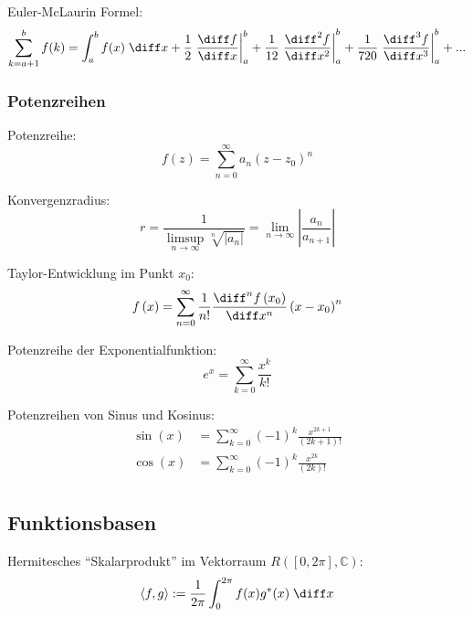 \documentclass[11pt]{article}
\numberwithin{equation}{section}
\begin{document}
          Euler-McLaurin Formel:
          \begin{equation}
            \sum_{k=a+1}^{b} f(k) = \int_{a}^{b}f(x) \;\diff x
            + \frac{1}{2}   \left.\frac{\diff   f}{\diff x  } \right|_{a}^{b}
            + \frac{1}{12}  \left.\frac{\diff^2 f}{\diff x^2} \right|_{a}^{b}
            + \frac{1}{720} \left.\frac{\diff^3 f}{\diff x^3} \right|_{a}^{b}
            + ...
          \end{equation}

        \subsubsection{Potenzreihen}
          Potenzreihe:
          \begin{equation}
            f(z) = \sum_{n=0}^{\infty} a_n (z-z_0)^n
          \end{equation}

          Konvergenzradius:
          \begin{equation}
            r = \frac{1}{\limsup\limits_{n\rightarrow\infty} \sqrt[n]{\left|a_n\right|}} = \lim_{n\rightarrow\infty}\left|\frac{a_n}{a_{n+1}}\right|
          \end{equation}

          Taylor-Entwicklung im Punkt $x_0$:
          \begin{equation}
            f\left(x\right)=\sum_{n=0}^{\infty}\frac{1}{n!}\frac{\diff^{n}f\left(x_0\right)}{\diff x^{n}}\left(x-x_0\right)^{n}
          \end{equation}

    			Potenzreihe der Exponentialfunktion:
    			\begin{equation}
    				e^x=\sum_{k=0}^{\infty}{\frac{x^k}{k!}}
    			\end{equation}

          Potenzreihen von Sinus und Kosinus:
          \begin{equation}
            \begin{aligned}
              \sin(x) &= \sum_{k=0}^\infty (-1)^k \frac{x^{2k+1}}{(2k+1)!} \\
              \cos(x) &= \sum_{k=0}^\infty (-1)^k \frac{x^{2k}}{(2k)!} \\
            \end{aligned}
          \end{equation}

    \subsection{Funktionsbasen}
      Hermitesches ``Skalarprodukt'' im Vektorraum $R([0,2\pi],\mathbb{C})$:
      \begin{equation}
        \left<f,g\right>:=\frac{1}{2\pi}\int_0^{2\pi} f(x)g^* (x)\;\diff x
      \end{equation}
\end{document}
